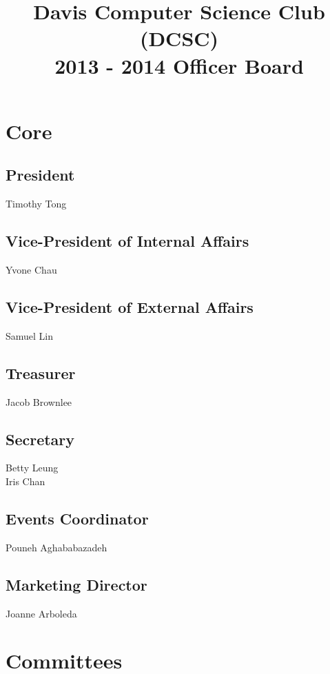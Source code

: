 \documentclass[10pt]{article}
\title{Davis Computer Science Club (DCSC)\\2013 - 2014 Officer Board}
\date{}
\author{}
\begin{document}
\maketitle

\section{Core}

\subsection{President}

Timothy Tong

\subsection{Vice-President of Internal Affairs}

Yvone Chau

\subsection{Vice-President of External Affairs}

Samuel Lin

\subsection{Treasurer}

Jacob Brownlee

\subsection{Secretary}

Betty Leung\\
Iris Chan

\subsection{Events Coordinator}

Pouneh Aghababazadeh

\subsection{Marketing Director}

Joanne Arboleda

\section{Committees}
\end{document}
